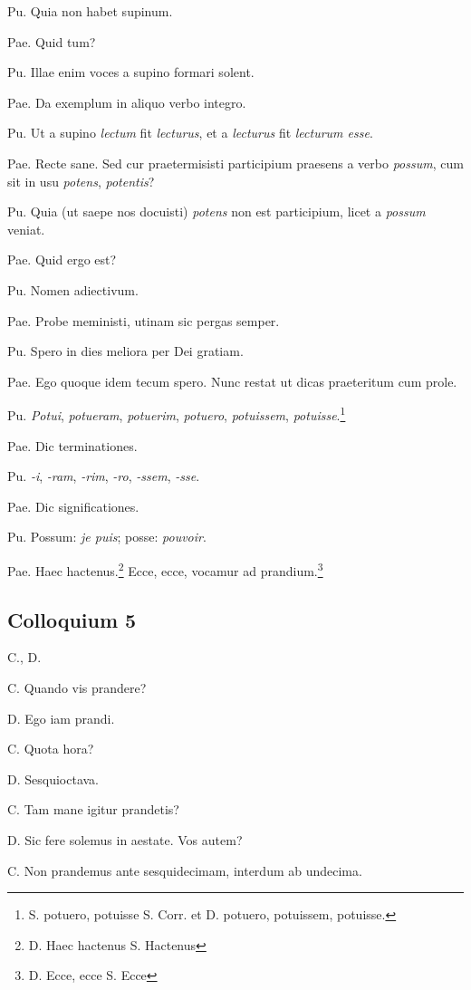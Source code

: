 \documentclass{article}
\newcommand{\fr}[1]{\foreignlanguage{french}{\emph{#1}}}
\begin{document}
Pu. Quia non habet supinum.

Pae. Quid tum?

Pu. Illae enim voces a supino formari solent.

Pae. Da exemplum in aliquo verbo integro.

Pu. Ut a supino \emph{lectum} fit \emph{lecturus}, et a \emph{lecturus} fit \emph{lecturum esse}.

Pae. Recte sane. Sed cur praetermisisti participium praesens a verbo \emph{possum}, cum sit in usu \emph{potens}, \emph{potentis}?

Pu. Quia (ut saepe nos docuisti) \emph{potens} non est participium, licet a \emph{possum} veniat.

Pae. Quid ergo est?

Pu. Nomen adiectivum.

Pae. Probe meministi, utinam sic pergas semper.

Pu. Spero in dies meliora per Dei gratiam.

Pae. Ego quoque idem tecum spero. Nunc restat ut dicas praeteritum cum prole.

Pu. \emph{Potui}, \emph{potueram}, \emph{potuerim}, \emph{potuero}, \emph{potuissem}, \emph{potuisse}.\footnote{S. potuero, potuisse S. Corr. et D. potuero, potuissem, potuisse.}

Pae. Dic terminationes.

Pu. \emph{-i}, \emph{-ram}, \emph{-rim}, \emph{-ro}, \emph{-ssem}, \emph{-sse}.

Pae. Dic significationes.

Pu. Possum: \fr{je puis}; posse: \fr{pouvoir}.

Pae. Haec hactenus.\footnote{D. Haec hactenus S. Hactenus} Ecce, ecce, vocamur ad prandium.\footnote{D. Ecce, ecce S. Ecce}

\subsection{Colloquium 5}
C., D.

C. Quando vis prandere?

D. Ego iam prandi.

C. Quota hora?

D. Sesquioctava.

C. Tam mane igitur prandetis?

D. Sic fere solemus in aestate. Vos autem?

C. Non prandemus ante sesquidecimam, interdum ab undecima.
\end{document}
